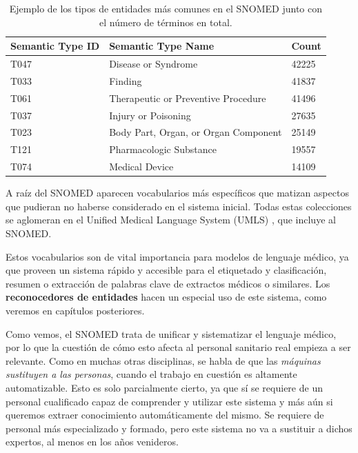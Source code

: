 \begin{table}[h]
    \centering
    \begin{tabular}{@{}lll@{}}
    \toprule
    \textbf{Semantic Type ID} & \textbf{Semantic Type Name}          & \textbf{Count} \\ \midrule
    T047                      & Disease or Syndrome                  & 42225          \\
    T033                      & Finding                              & 41837          \\
    T061                      & Therapeutic or Preventive Procedure  & 41496          \\
    T037                      & Injury or Poisoning                  & 27635          \\
    T023                      & Body Part, Organ, or Organ Component & 25149          \\
    T121                      & Pharmacologic Substance              & 19557          \\
    T074                      & Medical Device                       & 14109          \\ \bottomrule
    \end{tabular}
    \caption{Ejemplo de los tipos de entidades más comunes en el SNOMED junto con el número de términos en total.}
    \label{tab:snomed-example}
    \end{table}


A raíz del SNOMED aparecen vocabularios más específicos que matizan aspectos que pudieran no haberse considerado en el sistema inicial. Todas estas colecciones se aglomeran en el Unified Medical Language System (UMLS) \cite{UMLS}, que incluye al SNOMED.

Estos vocabularios son de vital importancia para modelos de lenguaje médico, ya que proveen un sistema rápido y accesible para el etiquetado y clasificación, resumen o extracción de palabras clave de extractos médicos o similares. Los \textbf{reconocedores de entidades} hacen un especial uso de este sistema, como veremos en capítulos posteriores.

Como vemos, el SNOMED trata de unificar y sistematizar el lenguaje médico, por lo que la cuestión de cómo esto afecta al personal sanitario real empieza a ser relevante. Como en muchas otras disciplinas, se habla de que las \textit{máquinas sustituyen a las personas}, cuando el trabajo en cuestión es altamente automatizable. Esto es solo parcialmente cierto, ya que sí se requiere de un personal cualificado capaz de comprender y utilizar este sistema y más aún si queremos extraer conocimiento automáticamente del mismo. Se requiere de personal más especializado y formado, pero este sistema no va a sustituir a dichos expertos, al menos en los años venideros.


